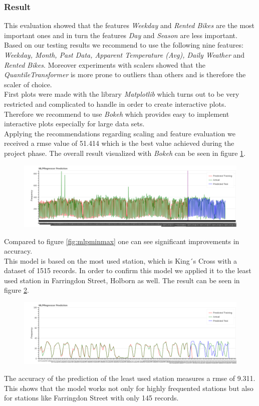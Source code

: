 \subsubsection{Result}\label{sec:resultmlp}
This evaluation showed that the features \emph{Weekday} and \emph{Rented Bikes} are the most important ones and in turn the features \emph{Day} and \emph{Season} are less important.
Based on our testing results we recommend to use the following nine features: \emph{Weekday, Month, Past Data, Apparent Temperature (Avg), Daily Weather} and \emph{Rented Bikes}. 
Moreover experiments with scalers showed that the \emph{QuantileTransformer} is more prone to outliers than others and is therefore the scaler of choice.\\
First plots were made with the library \emph{Matplotlib} which turns out to be very restricted and complicated to handle in order to create interactive plots. Therefore we recommend to use \emph{Bokeh} which provides easy to implement interactive plots especially for large data sets.\\
Applying the recommendations regarding scaling and feature evaluation we received a \acs{rmse} value of 51.414 which is the best value achieved during the project phase. The overall result visualized with \emph{Bokeh} can be seen in figure \ref{fig:mlpquantile}.
\begin{figure}[H]
\hspace{-2.8cm}
\includegraphics[width=1.4\textwidth]{img/mlpquantile}\label{fig:mlpquantile}
\label{fig:mlpquantile}
\end{figure}
Compared to figure \ref{fig:mlpminmax} one can see significant improvements in accuracy.\\
This model is based on the most used station, which is King´s Cross with a dataset of 1515 records. In order to confirm this model we applied it to the least used station in Farringdon Street, Holborn as well. The result can be seen in figure  \ref{fig:mlpquantile_least}.
\begin{figure}[H]
\hspace{-2.8cm}
\includegraphics[width=1.4\textwidth]{img/mlpquantile_least}\label{fig:mlpquantile_least}
\label{fig:mlpquantile_least}
\end{figure}
The accuracy of the prediction of the least used station measures a \acs{rmse} of 9.311. This shows that the model works not only for highly frequented stations but also for stations like Farringdon Street with only 145 records.